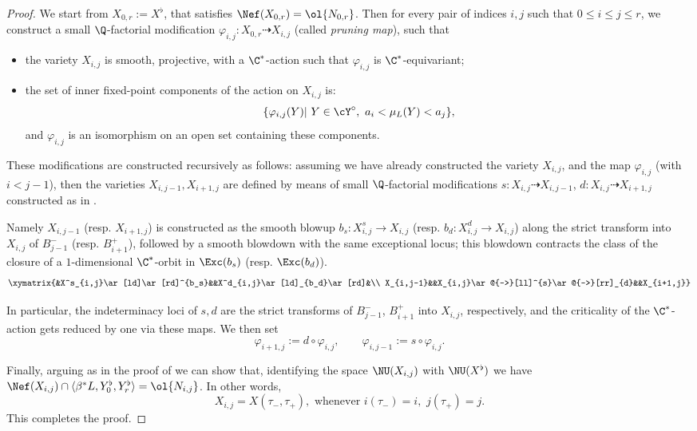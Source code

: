 \documentclass[reqno]{amsproc}
\theoremstyle{definition}
\def\prul{s}
\def\prur{d}
\begin{document}
\begin{proof}
We start from $X_{0,r}:=X^\flat$, that satisfies $\Nef(X_{0,r})=\ol{N_{0,r}}$. Then for every pair of indices $i,j$ such that $0 \le i \le j \le r$, we construct a small $\Q$-factorial modification $\varphi_{i,j}:X_{0,r}\dashrightarrow X_{i,j}$ (called {\em pruning map}), such that

\begin{itemize}[topsep=10pt]
\item the variety $X_{i,j}$ is smooth, projective, with a $\C^*$-action such that $\varphi_{i,j}$ is $\C^*$-equivariant;
\item the set of inner fixed-point components of the action on  $X_{i,j}$ is:  
$$
\{\varphi_{i,j}(Y)|\,\,Y\in\cY^\circ,\,\, a_i<\mu_L(Y)<a_j\},
$$
and $\varphi_{i,j}$ is an isomorphism on an open set containing these components.
\end{itemize}
These modifications are constructed recursively as follows: assuming we have already constructed the variety $X_{i,j}$, and the map $\varphi_{i,j}$ (with $i<j-1$), then the varieties $X_{i,j-1},X_{i+1,j}$ are defined by means of small $\Q$-factorial modifications $\prul: X_{i,j} \dashrightarrow X_{i,j-1}$, $\prur: X_{i,j} \dashrightarrow X_{i+1,j}$  constructed as in \cite[Theorem 3.1]{wors6-WORS3}.

Namely $X_{i,j-1}$ (resp. $X_{i+1,j}$) is constructed as the smooth blowup $b_\prul:X^\prul_{i,j} \to X_{i,j}$ (resp. $b_\prur:X^\prur_{i,j} \to X_{i,j}$) along the strict transform into $X_{i,j}$ of $B^-_{j-1}$ (resp. $B^+_{i+1}$), followed by a smooth blowdown with the same exceptional locus; this blowdown contracts the class of the closure of a $1$-dimensional $\C^*$-orbit in $\Exc(b_\prul)$ (resp. $\Exc(b_\prur)$). 
\begin{equation}\label{wors6:eq:blowups}\begin{gathered}
\xymatrix{&X^\prul_{i,j}\ar[ld]\ar[rd]^{b_\prul}&&X^\prur_{i,j}\ar[ld]_{b_\prur}\ar[rd]&\\
X_{i,j-1}&&X_{i,j}\ar@{-->}[ll]^{\prul}\ar@{-->}[rr]_{\prur}&&X_{i+1,j}}
\end{gathered}
\end{equation}

In particular, the indeterminacy loci of $\prul,\prur$ are the strict transforms of $B^-_{j-1}$, $B^+_{i+1}$ into $X_{i,j}$, respectively, and the criticality of the $\C^*$-action gets reduced by one via these maps.  
We then set $$\varphi_{i+1,j}:=\prur\circ\varphi_{i,j},\qquad\varphi_{i,j-1}:=\prul\circ\varphi_{i,j}.$$

Finally, arguing as in the proof of \cite[Proposition 4.11]{wors6-WORS3} we can show that, identifying the space $\NU(X_{i,j})$ with $\NU(X^\flat)$ we have $\Nef(X_{i,j})\cap \langle \beta^* L,Y^\flat_0,Y^\flat_r\rangle = \ol{N_{i,j}}$. In other words, 
$$
X_{i,j}=X(\tau_-,\tau_+), \mbox{ whenever } i(\tau_-)=i, \,\,j(\tau_+)=j.
$$
This completes the proof.
\end{proof}
\end{document}

